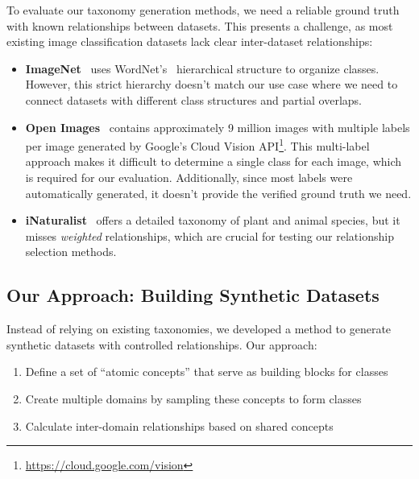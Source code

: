 To evaluate our taxonomy generation methods, we need a reliable ground truth with known relationships between datasets. This presents a challenge, as most existing image classification datasets lack clear inter-dataset relationships:

\begin{itemize}
      \item \textbf{ImageNet}~\cite{deng_imagenet_2009,russakovsky_imagenet_2015}
            uses WordNet's~\cite{fellbaum_wordnet_1998} hierarchical structure to organize classes.
            However, this strict hierarchy doesn't match our use case where we need to connect
            datasets with different class structures and partial overlaps.

      \item \textbf{Open Images}~\cite{kuznetsova_open_2020} contains approximately 9 million
            images with multiple labels per image generated by Google's Cloud Vision API\footnote{\url{https://cloud.google.com/vision}}.
            This multi-label approach makes it difficult to determine a single class for each image,
            which is required for our evaluation. Additionally, since most labels were automatically
            generated, it doesn't provide the verified ground truth we need.

      \item \textbf{iNaturalist}~\cite{horn_inaturalist_2018} offers a detailed taxonomy of
            plant and animal species, but it misses \textit{weighted} relationships, which are crucial for testing our relationship selection methods.
\end{itemize}

\subsection{Our Approach: Building Synthetic Datasets}

Instead of relying on existing taxonomies, we developed a method to generate synthetic datasets with controlled relationships. Our approach:

\begin{enumerate}
      \item Define a set of \enquote{atomic concepts} that serve as building blocks for classes
      \item Create multiple domains by sampling these concepts to form classes
      \item Calculate inter-domain relationships based on shared concepts
\end{enumerate}

